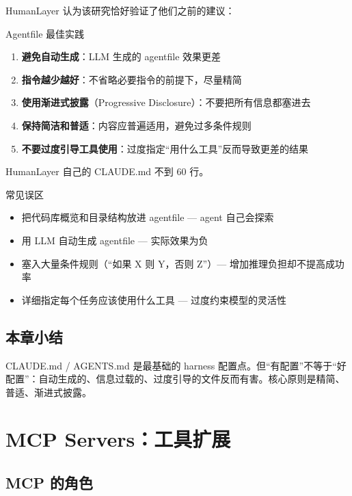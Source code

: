 \documentclass[a4paper]{article}
\begin{document}
HumanLayer 认为该研究恰好验证了他们之前的建议：

\begin{importantbox}{Agentfile 最佳实践}
\begin{enumerate}[leftmargin=1.5em]
    \item \textbf{避免自动生成}：LLM 生成的 agentfile 效果更差
    \item \textbf{指令越少越好}：不省略必要指令的前提下，尽量精简
    \item \textbf{使用渐进式披露}（Progressive Disclosure）：不要把所有信息都塞进去
    \item \textbf{保持简洁和普适}：内容应普遍适用，避免过多条件规则
    \item \textbf{不要过度引导工具使用}：过度指定``用什么工具''反而导致更差的结果
\end{enumerate}
HumanLayer 自己的 CLAUDE.md 不到 60 行。
\end{importantbox}

\begin{warningbox}{常见误区}
\begin{itemize}[leftmargin=1.5em]
    \item 把代码库概览和目录结构放进 agentfile --- agent 自己会探索
    \item 用 LLM 自动生成 agentfile --- 实际效果为负
    \item 塞入大量条件规则（``如果 X 则 Y，否则 Z''）--- 增加推理负担却不提高成功率
    \item 详细指定每个任务应该使用什么工具 --- 过度约束模型的灵活性
\end{itemize}
\end{warningbox}

\subsection{本章小结}

CLAUDE.md / AGENTS.md 是最基础的 harness 配置点。但``有配置''不等于``好配置''：自动生成的、信息过载的、过度引导的文件反而有害。核心原则是精简、普适、渐进式披露。


\section{MCP Servers：工具扩展}

\subsection{MCP 的角色}
\end{document}
